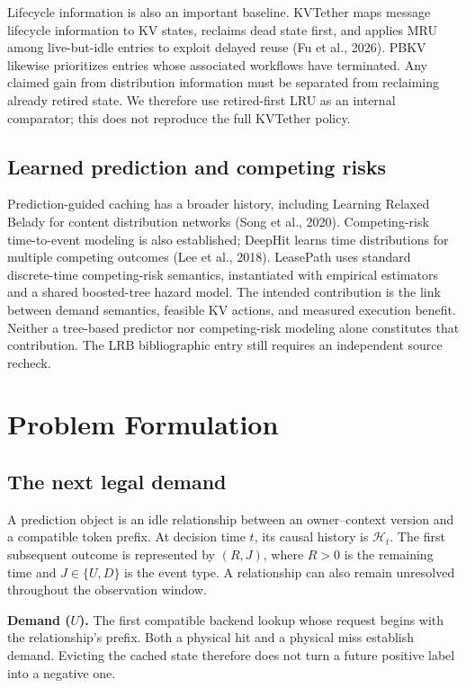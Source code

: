 \documentclass[sigconf, screen, review]{acmart}
\begin{document}
Lifecycle information is also an important baseline. KVTether maps
message lifecycle information to KV states, reclaims dead state first,
and applies MRU among live-but-idle entries to exploit delayed reuse (Fu
et al., 2026). PBKV likewise prioritizes entries whose associated
workflows have terminated. Any claimed gain from distribution
information must be separated from reclaiming already retired state. We
therefore use retired-first LRU as an internal comparator; this does not
reproduce the full KVTether policy.

\subsection{Learned prediction and competing
risks}\label{learned-prediction-and-competing-risks}

Prediction-guided caching has a broader history, including Learning
Relaxed Belady for content distribution networks (Song et al., 2020).
Competing-risk time-to-event modeling is also established; DeepHit
learns time distributions for multiple competing outcomes (Lee et al.,
2018). LeasePath uses standard discrete-time competing-risk semantics,
instantiated with empirical estimators and a shared boosted-tree hazard
model. The intended contribution is the link between demand semantics,
feasible KV actions, and measured execution benefit. Neither a
tree-based predictor nor competing-risk modeling alone constitutes that
contribution. The LRB bibliographic entry still requires an independent
source recheck.

\section{Problem Formulation}\label{problem-formulation}

\subsection{The next legal demand}\label{the-next-legal-demand}

A prediction object is an idle relationship between an owner--context
version and a compatible token prefix. At decision time \(t\), its
causal history is \(\mathcal H_t\). The first subsequent outcome is
represented by \((R,J)\), where \(R>0\) is the remaining time and
\(J\in\{U,D\}\) is the event type. A relationship can also remain
unresolved throughout the observation window.

\textbf{Demand (\(U\)).} The first compatible backend lookup whose
request begins with the relationship's prefix. Both a physical hit and a
physical miss establish demand. Evicting the cached state therefore does
not turn a future positive label into a negative one.
\end{document}

